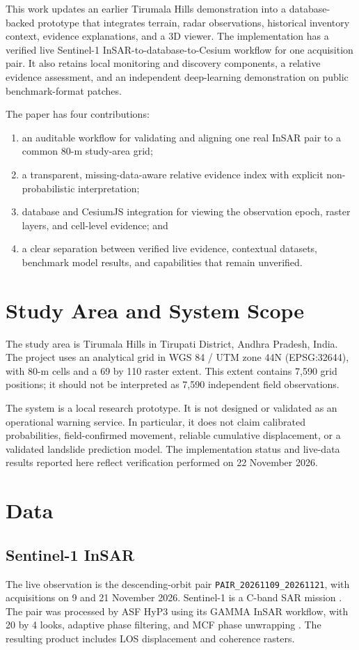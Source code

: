 \documentclass[conference]{IEEEtran}
\begin{document}
This work updates an earlier Tirumala Hills demonstration into a
database-backed prototype that integrates terrain, radar observations,
historical inventory context, evidence explanations, and a 3D viewer. The
implementation has a verified live Sentinel-1 InSAR-to-database-to-Cesium
workflow for one acquisition pair. It also retains local monitoring and
discovery components, a relative evidence assessment, and an independent
deep-learning demonstration on public benchmark-format patches.

The paper has four contributions:
\begin{enumerate}
    \item an auditable workflow for validating and aligning one real InSAR
    pair to a common 80-m study-area grid;
    \item a transparent, missing-data-aware relative evidence index with
    explicit non-probabilistic interpretation;
    \item database and CesiumJS integration for viewing the observation epoch,
    raster layers, and cell-level evidence; and
    \item a clear separation between verified live evidence, contextual
    datasets, benchmark model results, and capabilities that remain unverified.
\end{enumerate}

\section{Study Area and System Scope}
The study area is Tirumala Hills in Tirupati District, Andhra Pradesh, India.
The project uses an analytical grid in WGS 84 / UTM zone 44N
(EPSG:32644), with 80-m cells and a 69 by 110 raster extent. This extent
contains 7,590 grid positions; it should not be interpreted as 7,590
independent field observations.

The system is a local research prototype. It is not designed or validated as
an operational warning service. In particular, it does not claim calibrated
probabilities, field-confirmed movement, reliable cumulative displacement,
or a validated landslide prediction model. The implementation status and
live-data results reported here reflect verification performed on
22 November 2026.

\section{Data}
\subsection{Sentinel-1 InSAR}
The live observation is the descending-orbit pair
\texttt{PAIR\_20261109\_20261121}, with acquisitions on 9 and 21 November 2026.
Sentinel-1 is a C-band SAR mission \cite{sentinel1}. The pair was processed by
ASF HyP3 using its GAMMA InSAR workflow, with 20 by
4 looks, adaptive phase filtering, and MCF phase unwrapping \cite{hyp3}.
The resulting product includes LOS displacement and coherence rasters.
\end{document}
